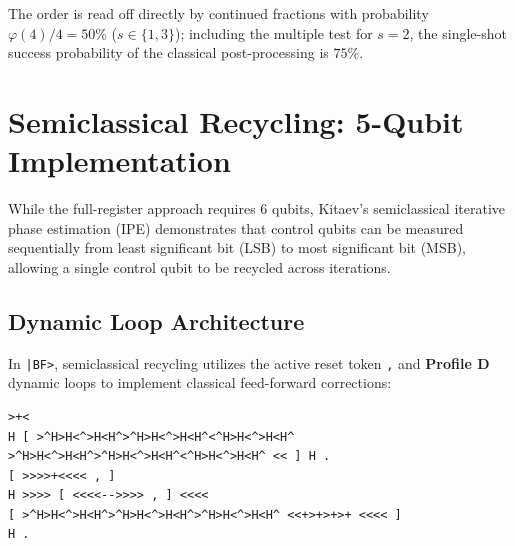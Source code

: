 \documentclass[11pt,a4paper,twocolumn]{article}
\begin{document}
\begin{table}[h!]
\centering
{}
\caption{Measurement statistics and factor extraction for $N = 15$ (full register: $c_0$ is the most significant phase bit).}
\label{tab:measurement_dist}
\end{table}
The order is read off directly by continued fractions with probability $\varphi(4)/4 = 50\%$ ($s \in \{1, 3\}$); including the multiple test for $s = 2$, the single-shot success probability of the classical post-processing is $75\%$.

\section{Semiclassical Recycling: 5-Qubit Implementation}

While the full-register approach requires 6 qubits, Kitaev's semiclassical iterative phase estimation (IPE) \cite{kitaev1995quantum,griffiths1996semiclassical,monz2016realization} demonstrates that control qubits can be measured sequentially from least significant bit (LSB) to most significant bit (MSB), allowing a single control qubit to be recycled across iterations.

\subsection{Dynamic Loop Architecture}
In \texttt{|BF>}, semiclassical recycling utilizes the active reset token \texttt{,} and \textbf{Profile D} dynamic loops to implement classical feed-forward corrections:

\begin{lstlisting}[caption={Semiclassical 5-qubit Shor algorithm in \texttt{|BF>}.}]
>+<
H [ >^H>H<^>H<H^>^H>H<^>H<H^<^H>H<^>H<H^ >^H>H<^>H<H^>^H>H<^>H<H^<^H>H<^>H<H^ << ] H .
[ >>>>+<<<< , ]
H >>>> [ <<<<-->>>> , ] <<<<
[ >^H>H<^>H<H^>^H>H<^>H<H^>^H>H<^>H<H^ <<+>+>+>+ <<<< ]
H .
\end{lstlisting}
\end{document}
